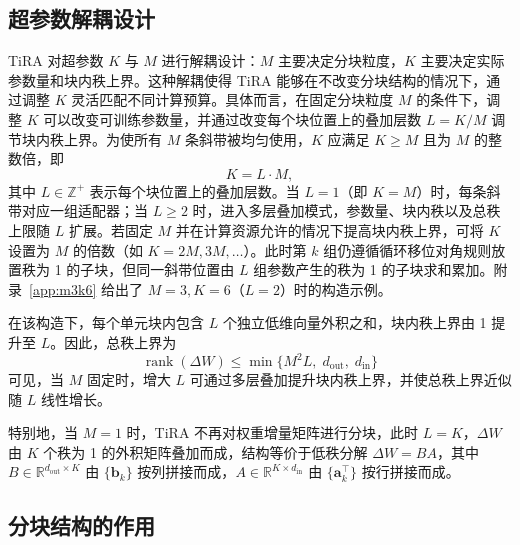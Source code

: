﻿\documentclass[UTF8,a4paper,11pt]{ctexart}
\newcommand{\R}{\mathbb{R}}
\newcommand{\DeltaW}{\Delta W}
\newcommand{\rank}{\operatorname{rank}}
\begin{document}
\subsection{超参数解耦设计}

TiRA 对超参数 $K$ 与 $M$ 进行解耦设计：$M$ 主要决定分块粒度，$K$ 主要决定实际参数量和块内秩上界。这种解耦使得 TiRA 能够在不改变分块结构的情况下，通过调整 $K$ 灵活匹配不同计算预算。具体而言，在固定分块粒度 $M$ 的条件下，调整 $K$ 可以改变可训练参数量，并通过改变每个块位置上的叠加层数 $L=K/M$ 调节块内秩上界。为使所有 $M$ 条斜带被均匀使用，$K$ 应满足 $K\geq M$ 且为 $M$ 的整数倍，即
\begin{equation}
    K=L\cdot M,
\end{equation}
其中 $L\in\mathbb{Z}^{+}$ 表示每个块位置上的叠加层数。当 $L=1$（即 $K=M$）时，每条斜带对应一组适配器；当 $L\geq2$ 时，进入多层叠加模式，参数量、块内秩以及总秩上限随 $L$ 扩展。若固定 $M$ 并在计算资源允许的情况下提高块内秩上界，可将 $K$ 设置为 $M$ 的倍数（如 $K=2M,3M,\ldots$）。此时第 $k$ 组仍遵循循环移位对角规则放置秩为 1 的子块，但同一斜带位置由 $L$ 组参数产生的秩为 1 的子块求和累加。附录~\ref{app:m3k6} 给出了 $M=3,K=6$（$L=2$）时的构造示例。

在该构造下，每个单元块内包含 $L$ 个独立低维向量外积之和，块内秩上界由 1 提升至 $L$。因此，总秩上界为
\begin{equation}
    \rank(\DeltaW)\leq \min\{M^2L,\;d_{\mathrm{out}},\;d_{\mathrm{in}}\}
\end{equation}
可见，当 $M$ 固定时，增大 $L$ 可通过多层叠加提升块内秩上界，并使总秩上界近似随 $L$ 线性增长。

特别地，当 $M=1$ 时，TiRA 不再对权重增量矩阵进行分块，此时 $L=K$，$\DeltaW$ 由 $K$ 个秩为 1 的外积矩阵叠加而成，结构等价于低秩分解 $\DeltaW=BA$，其中 $B\in\R^{d_{\mathrm{out}}\times K}$ 由 $\{\bm{b}_k\}$ 按列拼接而成，$A\in\R^{K\times d_{\mathrm{in}}}$ 由 $\{\bm{a}_k^{\top}\}$ 按行拼接而成。

\subsection{分块结构的作用}
\end{document}
